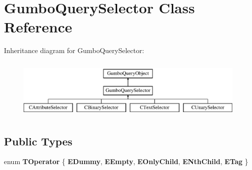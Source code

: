 \hypertarget{class_gumbo_query_selector}{}\section{Gumbo\+Query\+Selector Class Reference}
\label{class_gumbo_query_selector}
Inheritance diagram for Gumbo\+Query\+Selector\+:\begin{figure}[H]
\begin{center}
\leavevmode
\includegraphics[height=2.957747cm]{class_gumbo_query_selector}
\end{center}
\end{figure}
\subsection*{Public Types}
\begin{DoxyCompactItemize}
\item 
\mbox{\label{class_gumbo_query_selector_a44066a12920e181767cbb4e5a14af87e}} 
enum {\bfseries T\+Operator} \{ \newline
{\bfseries E\+Dummy}, 
{\bfseries E\+Empty}, 
{\bfseries E\+Only\+Child}, 
{\bfseries E\+Nth\+Child}, 
\newline
{\bfseries E\+Tag}
 \}
\end{DoxyCompactItemize}
